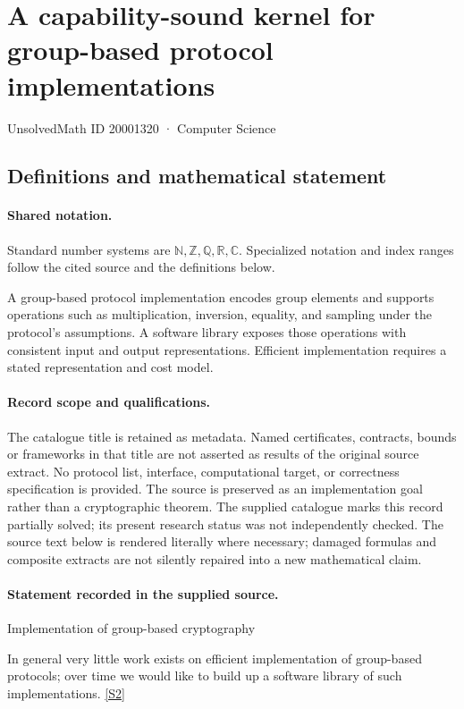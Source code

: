 \documentclass[11pt]{article}
\newcommand{\sref}[2]{\hyperlink{source:#1:#2}{[S#2]}}
\begin{document}
\setcounter{section}{20001319}
\section{A capability-sound kernel for group-based protocol implementations}\label{20001320}
{\small\sffamily UnsolvedMath ID 20001320 · Computer Science}
\subsection{Definitions and mathematical statement}

\paragraph{Shared notation.}Standard number systems are $\mathbb N,\mathbb Z,\mathbb Q,\mathbb R,\mathbb C$. Specialized notation and index ranges follow the cited source and the definitions below.


A group-based protocol implementation encodes group elements and supports operations such as multiplication, inversion, equality, and sampling under the protocol's assumptions. A software library exposes those operations with consistent input and output representations. Efficient implementation requires a stated representation and cost model.
\paragraph{Record scope and qualifications.}
The catalogue title is retained as metadata. Named certificates, contracts, bounds or frameworks in that title are not asserted as results of the original source extract.
No protocol list, interface, computational target, or correctness specification is provided. The source is preserved as an implementation goal rather than a cryptographic theorem. The supplied catalogue marks this record partially solved; its present research status was not independently checked.
The source text below is rendered literally where necessary; damaged formulas and composite extracts are not silently repaired into a new mathematical claim.
\paragraph{Statement recorded in the supplied source.}
Implementation of group-based cryptography

In general very little work exists on efficient implementation of group-based protocols; over time we would like to build up a software library of such implementations. \sref{20001320}{2}
\end{document}
